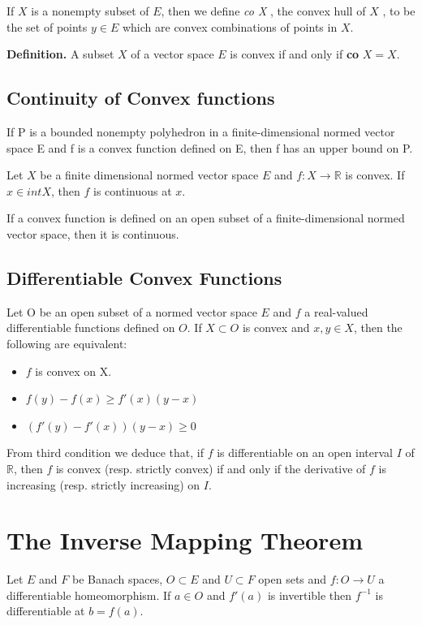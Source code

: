\documentclass[12 pt]{article}
\theoremstyle{definition}
\theoremstyle{remark}
\newcommand{\R}{\mathbb{R}}
\begin{document}
If $X$ is a nonempty subset of $E$, then we
define \textit{co X} , the convex hull of $X$ , to be the set of points $y \in E$ which are convex combinations of points in $X$.

\textbf{Definition.} A subset $X$ of a vector space $E$ is convex if and only if \textbf{co} $X = X$.

\subsection{Continuity of Convex functions}
\lemma If P is a bounded nonempty polyhedron in a finite-dimensional normed vector space E and f is a convex function defined on E, then f has an upper bound on P.

\theorem Let $X$ be a finite dimensional normed vector space $E$ and $f: X \to \R$ is convex. If $x \in int X$, then $f$ is continuous at $x$.

\corollary If a convex function is defined on an open subset of a finite-dimensional normed vector space, then it is continuous.
\normalfont
\subsection{Differentiable Convex Functions}
Let O be an open subset of a normed vector space $E$ and $f$ a real-valued differentiable functions defined on $O$. If $X \subset O$ is convex and $x, y \in X$, then the following are equivalent:
\begin{itemize}
\item $f$ is convex on X.
\item $f(y) - f(x) \geq f'(x)(y-x)$
\item $ (f'(y) - f'(x))(y-x) \geq 0$
\end{itemize}

\remark From third condition we deduce that, if $f$ is differentiable on
an open interval $I$ of $\R$, then $f$ is convex (resp. strictly convex) if and only if the
derivative of $f$ is increasing (resp. strictly increasing) on $I$.
\normalfont

\section{The Inverse Mapping Theorem}
\proposition Let $E$ and $F$ be Banach spaces, $O \subset E$ and $U \subset F$ open
sets and $f : O \to U$ a differentiable homeomorphism. If $a \in O$ and $f'(a)$ is invertible then $f^{-1}$ is differentiable at $b = f(a)$.
\end{document}
